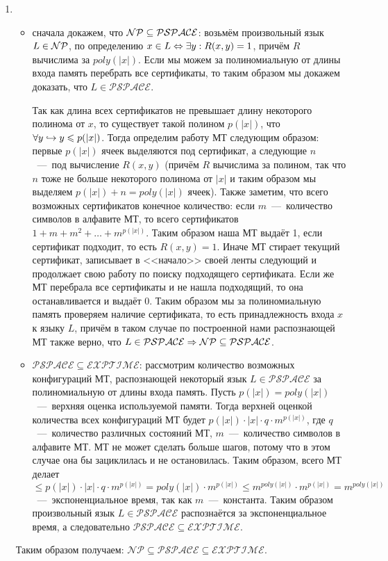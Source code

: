 \documentclass[a4paper,12pt]{article}
\begin{document}
\begin{solution}
\begin{enumerate}
	\item \begin{itemize}
		\item сначала докажем, что $\mathcal{NP} \subseteq \mathcal{PSPACE}$: возьмём произвольный язык $L \in \mathcal{NP}$, по определению $x\in L \Leftrightarrow \exists y: R(x, y) = 1$, причём $R$ вычислима за $poly(|x|)$. Если мы можем за полиномиальную от длины входа память перебрать все сертификаты, то таким образом мы докажем доказать, что $L \in \mathcal{PSPACE}$.
		
		Так как длина всех сертификатов не превышает длину некоторого полинома от $x$, то существует такой полином $p(|x|)$, что $\forall y \hookrightarrow y \leqslant p(|x|)$. Тогда определим работу МТ следующим образом: первые $p(|x|)$ ячеек выделяются под сертификат, а следующие $n$~---~под вычисление $R(x,y)$ (причём $R$ вычислима за полином, так что $n$ тоже не больше некоторого полинома от $|x|$ и таким образом мы выделяем $p(|x|) + n = poly(|x|)$ ячеек). Также заметим, что всего возможных сертификатов конечное количество: если $m$~---~количество символов в алфавите МТ, то всего сертификатов $1 + m + m^2 + \ldots + m^{p(|x|)}$. Таким образом наша МТ выдаёт 1, если сертификат подходит, то есть $R(x, y) = 1$. Иначе МТ стирает текущий сертификат, записывает в <<начало>> своей ленты следующий и продолжает свою работу по поиску подходящего сертификата. Если же МТ перебрала все сертификаты и не нашла подходящий, то она останавливается и выдаёт 0. Таким образом мы за полиномиальную память проверяем наличие сертификата, то есть принадлежность входа $x$ к языку $L$, причём в таком случае по построенной нами распознающей МТ также верно, что $L \in \mathcal{PSPACE} \Rightarrow \mathcal{NP} \subseteq \mathcal{PSPACE}$.
		
		\item $\mathcal{PSPACE} \subseteq \mathcal{EXPTIME}$: рассмотрим количество возможных конфигураций МТ, распознающей некоторый язык $L \in \mathcal{PSPACE}$ за полиномиальную от длины входа память. Пусть $p(|x|)=poly(|x|)$~---~верхняя оценка используемой памяти. Тогда верхней оценкой количества всех конфигураций МТ будет $p(|x|) \cdot |x| \cdot q \cdot m^{p(|x|)}$, где $q$~---~количество различных состояний МТ, $m$~---~количество символов в алфавите МТ. МТ не может сделать больше шагов, потому что в этом случае она бы зациклилась и не остановилась. Таким образом, всего МТ делает $\le p(|x|) \cdot |x| \cdot q \cdot m^{p(|x|)} = poly(|x|) \cdot m^{p(|x|)} \le m^{poly(|x|)} \cdot m^{p(|x|)} = m^{poly(|x|)}$~---~экспоненциальное время, так как $m$~---~константа. Таким образом произвольный язык $L \in \mathcal{PSPACE}$ распознаётся за экспоненциальное время, а следовательно $\mathcal{PSPACE} \subseteq \mathcal{EXPTIME}$.
		
	\end{itemize}
	
	Таким образом получаем: $\mathcal{NP}\subseteq \mathcal{PSPACE}\subseteq \mathcal{EXPTIME}$.
	
	\end{enumerate}
	
\end{solution}
\end{document}
